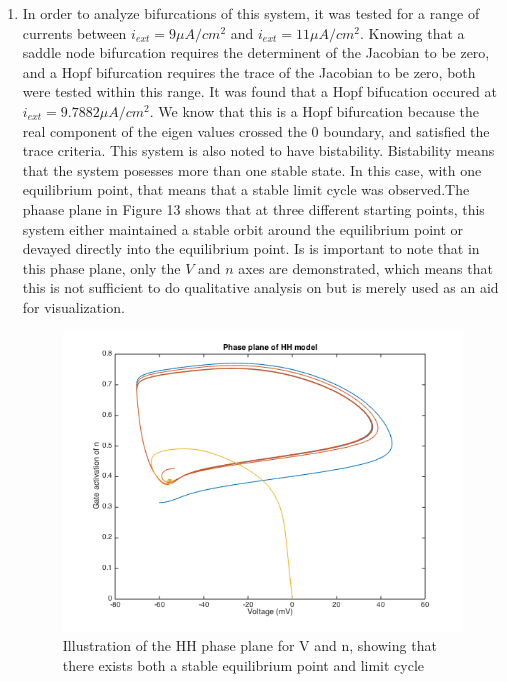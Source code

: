 \documentclass[10pt]{report}
\begin{document}
\begin{enumerate}
\item In order to analyze bifurcations of this system, it was tested for a range of currents between $i_{ext} = 9 \mu A/cm^2$ and $i_{ext} = 11 \mu A/cm^2$. Knowing that a saddle node bifurcation requires the determinent of the Jacobian to be zero, and a Hopf bifurcation requires the trace of the Jacobian to be zero, both were tested within this range. It was found that a Hopf bifucation occured at $i_{ext} = 9.7882 \mu A / cm^2$. We know that this is a Hopf bifurcation because the real component of the eigen values crossed the 0 boundary, and satisfied the trace criteria. This system is also noted to have bistability. Bistability means that the system posesses more than one stable state. In this case, with one equilibrium point, that means that a stable limit cycle was observed.The phaase plane in Figure 13 shows that at three different starting points, this system either maintained a stable orbit around the equilibrium point or devayed directly into the equilibrium point. Is is important to note that in this phase plane, only the $V$ and $n$ axes are demonstrated, which means that this is not sufficient to do qualitative analysis on but is merely used as an aid for visualization. \begin{figure}[h!] \includegraphics[scale=0.6]{motnq15.png} \caption[h13]{Illustration of the HH phase plane for V and n, showing that there exists both a stable equilibrium point and limit cycle} \end{figure}
%
%

\end{enumerate}
\end{document}
